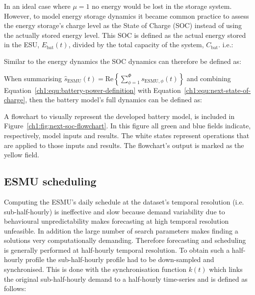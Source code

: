 In an ideal case where $\mu = 1$ no energy would be lost in the storage system.
However, to model energy storage dynamics it became common practice to assess the energy storage's charge level as the State of Charge (SOC) instead of using the actually stored energy level.
This SOC is defined as the actual energy stored in the ESU, $E_\text{bat}(t)$, divided by the total capacity of the system, $C_\text{bat}$. i.e.:



Similar to the energy dynamics the SOC dynamics can therefore be defined as:



When summarising $\hat{s}_\text{ESMU}(t) = \text{Re}\left\{\sum_{\phi=1}^{\Phi}s_{\text{ESMU},\phi}(t)\right\}$ and combining Equation~\ref{ch1:equ:battery-power-definition} with Equation~\ref{ch1:equ:next-state-of-charge}, then the battery model's full dynamics can be defined as:



A flowchart to visually represent the developed battery model, is included in Figure~\ref{ch1:fig:next-soc-flowchart}.
In this figure all green and blue fields indicate, respectively, model inputs and results.
The white states represent operations that are applied to those inputs and results.
The flowchart's output is marked as the yellow field.



\subsection{ESMU scheduling}
\label{ch1:subsec:esmu-scheduling}

Computing the ESMU's daily schedule at the dataset's temporal resolution (i.e. sub-half-hourly) is ineffective and slow because demand variability due to behavioural unpredictability makes forecasting at high temporal resolution unfeasible.
In addition the large number of search parameters makes finding a solutions very computationally demanding.
Therefore forecasting and scheduling is generally performed at half-hourly temporal resolution.
To obtain such a half-hourly profile the sub-half-hourly profile had to be down-sampled and synchronised.
This is done with the synchronisation function $k(t)$ which links the original sub-half-hourly demand to a half-hourly time-series and is defined as follows:

